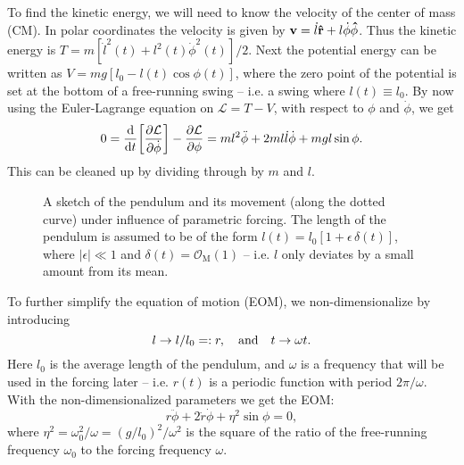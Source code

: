 \documentclass[10pt,letter, swedish, english,%
]{article}
\begin{document}
To find the kinetic energy, we will need to know the velocity of the
center of mass (CM). 
In polar coordinates the velocity is given by
$\vb{v}=\dot{l}\vu{r}+l\dot{\phi}\vu{\phi}$. Thus the kinetic energy is
$T=m[\dot{l}^2(t)+l^2(t)\dot{\phi}^2(t)]/2$.
Next the potential energy can be written as
$V=mg[l_0-l(t)\cos\phi(t)]$,
where the zero point of the potential is set at the bottom of a
free-running swing -- i.e. a swing where $l(t)\equiv l_0$. 
By now using the Euler-Lagrange equation on $\mathcal{L}=T-V$, with
 respect to $\phi$ and $\dot\phi$, we get
\begin{equation}
0=\dv{t}\qty[\pdv{\mathcal{L}}{\dot{\phi}}]-\pdv{\mathcal{L}}{\phi}
=ml^2\ddot\phi +2ml\dot{l}\dot\phi +mgl\sin\phi.
\end{equation}
This can be cleaned up by dividing through by $m$ and $l$. 

\begin{figure}\centering
\resizebox{.15\textwidth}{!}{}
\caption{A sketch of the pendulum and its movement (along the dotted
  curve) under influence of parametric forcing. The length of the
  pendulum is assumed to be of the form
  $l(t)=l_0[1+\epsilon\,\delta(t)]$, where $|\epsilon|\ll1$ and
  $\delta(t)=\mathcal{O}_\text{M}(1)$  -- i.e. $l$ only deviates by a
  small amount from its mean.  
}
\label{fig:pendulum}
\end{figure}



To further simplify the equation of motion (EOM), we
non-dimensionalize by introducing
\begin{equation}\label{eq:non-dim}
l\to {l}/{l_0}=:r\qcomma\text{and}\quad
t\to\omega t.
\end{equation}
Here $l_0$ is the average length of the pendulum, and $\omega$ is a
frequency that will be used in the forcing later -- i.e. $r(t)$ is a
periodic function with period $2\pi/\omega$. 
With the non-dimensionalized parameters we get the EOM:
\begin{equation}\label{eq:eom}
r\ddot\phi+2\dot{r}\dot\phi + \eta^2\sin\phi=0,
\end{equation}
where %
$\eta^2=\omega_0^2/\omega=(g/l_0)^2/\omega^2$ is the square of the
ratio of the free-running frequency $\omega_0$ to the forcing
frequency $\omega$. 
\end{document}
